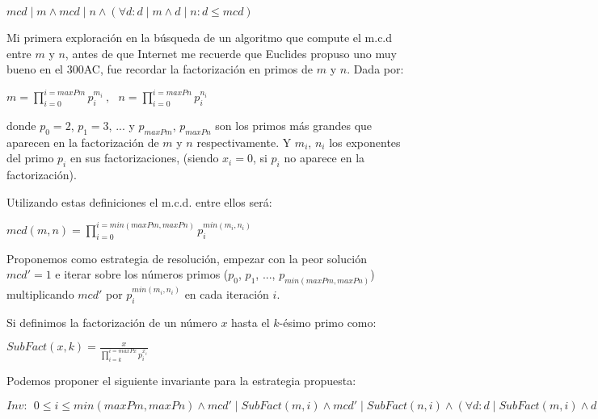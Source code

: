 \documentclass[12pt, a4paper, openany, fleqn]{book}
\begin{document}
    \begin{center}
        \begin{math}
            mcd \mid m \land mcd \mid n \land (\forall d: d \mid m \land d \mid n : d \leq mcd)
        \end{math}
    \end{center}

    Mi primera exploración en la búsqueda de un algoritmo que compute el m.c.d entre $m$ y $n$, antes de que Internet me recuerde que Euclides propuso uno muy bueno en el 300AC, fue recordar la factorización en primos de $m$ y $n$. Dada por:

    \begin{center}
        \begin{math}
            m = \prod_{i=0}^{i=maxPm} p_{i}^{m_i}\ , \ \ \ n = \prod_{i=0}^{i=maxPn} p_{i}^{n_i}
        \end{math}
    \end{center}

    donde $p_0=2$, $p_1= 3$, ... y $p_{maxPm}$, $p_{maxPn}$ son los primos más grandes que aparecen en la factorización de $m$ y $n$ respectivamente. Y $m_i$, $n_i$ los exponentes del primo $p_i$ en sus factorizaciones, (siendo $x_i=0$, si $p_i$ no aparece en la factorización).

    Utilizando estas definiciones el m.c.d. entre ellos será:

    \begin{center}
        \begin{math}
            mcd(m, n) = \prod_{i=0}^{i=min(maxPm, maxPn)} p_{i}^{min(m_i, n_i)}
        \end{math}
    \end{center}

    Proponemos como estrategia de resolución, empezar con la peor solución $mcd' = 1$ e iterar sobre los números primos ($p_0$, $p_1$, ..., $p_{min(maxPm, maxPn)}$) multiplicando $mcd'$ por $p_{i}^{min(m_{i}, n_{i})}$ en cada iteración $i$.

    Si definimos la factorización de un número $x$ hasta el $k$-ésimo primo como:
    \begin{center}
        \begin{math}
            SubFact(x, k) = \frac{x}{\prod_{i=k}^{i=maxPx} p_{i}^{x_i}} 
        \end{math}
    \end{center}

    Podemos proponer el siguiente invariante para la estrategia propuesta:
    \begin{center}
        \begin{math}
            Inv:\ \  0 \leqslant i \leqslant min(maxPm, maxPn) \land mcd' \mathrel{|} SubFact(m, i) \land mcd' \mathrel{|} SubFact(n, i) \land (\forall d: d \mathrel{|} SubFact(m, i) \land d \mathrel{|} SubFact(n, i) : d \leq mcd') 
        \end{math}
    \end{center}
\end{document}
